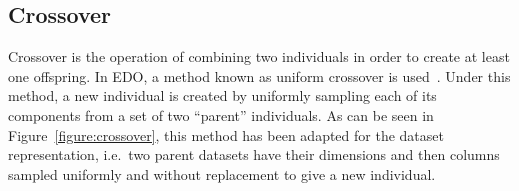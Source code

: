 \subsection{Crossover}

Crossover is the operation of combining two individuals in order to create at
least one offspring. In EDO, a method known as uniform crossover is
used~\cite{Semenkin2012}. Under this method, a new individual is created by
uniformly sampling each of its
components from a set of two ``parent'' individuals. As can be seen in
Figure~\ref{figure:crossover}, this method has been adapted for the dataset
representation, i.e.\ two parent datasets have their dimensions and then columns
sampled uniformly and without replacement to give a new individual.




